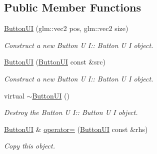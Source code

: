 \subsection*{Public Member Functions}
\begin{DoxyCompactItemize}
\item 
\hyperlink{class_button_u_i_a06e5f10c62feee5baf35f88f3af574b2}{Button\+UI} (glm\+::vec2 pos, glm\+::vec2 size)
\begin{DoxyCompactList}\small\item\em Construct a new Button U I\+:\+: Button U I object. \end{DoxyCompactList}\item 
\hyperlink{class_button_u_i_a64d56901e494b8ae4fdd550631135ce0}{Button\+UI} (\hyperlink{class_button_u_i}{Button\+UI} const \&src)
\begin{DoxyCompactList}\small\item\em Construct a new Button U I\+:\+: Button U I object. \end{DoxyCompactList}\item 
\mbox{\label{class_button_u_i_aec36b3db802067fa7a2f4bf0d7104284}} 
virtual \hyperlink{class_button_u_i_aec36b3db802067fa7a2f4bf0d7104284}{$\sim$\+Button\+UI} ()
\begin{DoxyCompactList}\small\item\em Destroy the Button U I\+:\+: Button U I object. \end{DoxyCompactList}\item 
\hyperlink{class_button_u_i}{Button\+UI} \& \hyperlink{class_button_u_i_a17cfc6a63fb650c756d7f0afadad665e}{operator=} (\hyperlink{class_button_u_i}{Button\+UI} const \&rhs)
\begin{DoxyCompactList}\small\item\em Copy this object. \end{DoxyCompactList}\end{DoxyCompactItemize}
